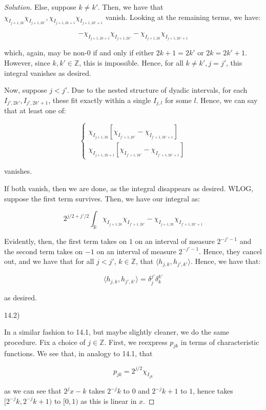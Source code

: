 \documentclass[10pt]{article}
\begin{document}
\begin{proof}[Solution]
Else, suppose $k \not = k'$. Then, we have that $\chi_{I_{j+1, 2k}}\chi_{I_{j+1, 2k'}},   \chi_{I_{j+1, 2k+1}} \chi_{I_{j+1, 2k'+1}}$ vanish. Looking at the remaining terms, we have:

$$  - \chi_{I_{j+1, 2k+1}}\chi_{I_{j+1, 2k'}} - \chi_{I_{j+1, 2k}}\chi_{I_{j+1, 2k'+1}} $$

which, again, may be non-0 if and only if either $2k + 1 = 2k'$ or $2k = 2k' + 1$. However, since $k, k' \in \mathbb{Z}$, this is impossible. Hence, for all $k \not = k', j = j'$, this integral vanishes as desired.

Now, suppose $j < j'$. Due to the nested structure of dyadic intervals, for each $I_{j',2k'}, I_{j', 2k'+1}$, these fit exactly within a single $I_{j, l}$ for some $l$. Hence, we can say that at least one of:

$$ \begin{cases} \chi_{I_{j+1, 2k}}[\chi_{I_{j'+1, 2k'}} - \chi_{I_{j'+1, 2k'+1}}] \\ \chi_{I_{j+1, 2k+1}} [\chi_{I_{j'+1, 2k'}} - \chi_{I_{j'+1, 2k'+1}}] \end{cases}$$

vanishes.

If both vanish, then we are done, as the integral disappears as desired. WLOG, suppose the first term survives. Then, we have our integral as:

$$ 2^{j/2 + j'/2} \int_{\mathbb{R}} \chi_{I_{j+1, 2k}}\chi_{I_{j'+1, 2k'}} -  \chi_{I_{j+1, 2k}}\chi_{I_{j'+1, 2k'+1}} $$

Evidently, then, the first term takes on $1$ on an interval of measure $2^{-j'-1}$ and the second term takes on $-1$ on an interval of measure $2^{-j'-1}$. Hence, they cancel out, and we have that for all $j < j'$, $k \in \mathbb{Z}$, that $ \langle h_{j,k}, h_{j', k'} \rangle$. Hence, we have that:

$$  \langle h_{j,k}, h_{j', k'} \rangle = \delta_j^{j'} \delta_k^{k'}$$

as desired.

14.2)

In a similar fashion to 14.1, but maybe slightly cleaner, we do the same procedure. Fix a choice of $j \in \mathbb{Z}$. First, we reexpress $p_{jk}$ in terms of characteristic functions. We see that, in analogy to 14.1, that

$$  p_{jk} = 2^{j/2} \chi_{I_{jk}} $$

as we can see that $2^j x - k$ takes $2^{-j}k$ to $0$ and $2^{-j} k+1$ to $1$, hence takes $[2^{-j}k, 2^{-j}k+1)$ to $[0,1)$ as this is linear in $x$. 


\end{proof}
\end{document}
